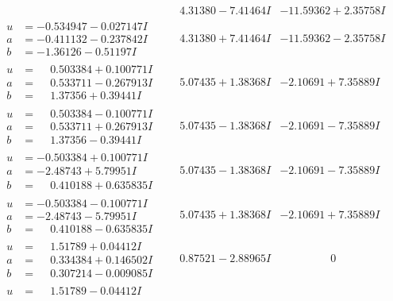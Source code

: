 \documentclass[1p]{elsarticle_modified}
\theoremstyle{definition}
\begin{document}
$$\begin{array}{c|c|c}
 & \phantom{-}4.31380 - 7.41464 I & -11.59362 + 2.35758 I \\ \hline\begin{aligned}
u &= -0.534947 - 0.027147 I \\
a &= -0.411132 - 0.237842 I \\
b &= -1.36126 - 0.51197 I\end{aligned}
 & \phantom{-}4.31380 + 7.41464 I & -11.59362 - 2.35758 I \\ \hline\begin{aligned}
u &= \phantom{-}0.503384 + 0.100771 I \\
a &= \phantom{-}0.533711 - 0.267913 I \\
b &= \phantom{-}1.37356 + 0.39441 I\end{aligned}
 & \phantom{-}5.07435 + 1.38368 I & -2.10691 + 7.35889 I \\ \hline\begin{aligned}
u &= \phantom{-}0.503384 - 0.100771 I \\
a &= \phantom{-}0.533711 + 0.267913 I \\
b &= \phantom{-}1.37356 - 0.39441 I\end{aligned}
 & \phantom{-}5.07435 - 1.38368 I & -2.10691 - 7.35889 I \\ \hline\begin{aligned}
u &= -0.503384 + 0.100771 I \\
a &= -2.48743 + 5.79951 I \\
b &= \phantom{-}0.410188 + 0.635835 I\end{aligned}
 & \phantom{-}5.07435 - 1.38368 I & -2.10691 - 7.35889 I \\ \hline\begin{aligned}
u &= -0.503384 - 0.100771 I \\
a &= -2.48743 - 5.79951 I \\
b &= \phantom{-}0.410188 - 0.635835 I\end{aligned}
 & \phantom{-}5.07435 + 1.38368 I & -2.10691 + 7.35889 I \\ \hline\begin{aligned}
u &= \phantom{-}1.51789 + 0.04412 I \\
a &= \phantom{-}0.334384 + 0.146502 I \\
b &= \phantom{-}0.307214 - 0.009085 I\end{aligned}
 & \phantom{-}0.87521 - 2.88965 I & \phantom{-0.000000 } 0 \\ \hline\begin{aligned}
u &= \phantom{-}1.51789 - 0.04412 I \\

\end{aligned}
\end{array}$$
\end{document}
